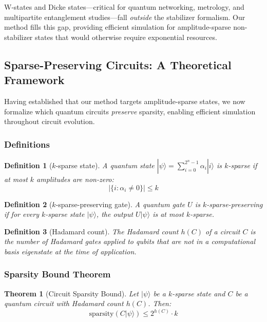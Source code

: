\documentclass[11pt,twocolumn]{article}
\newtheorem{theorem}{Theorem}
\newtheorem{definition}{Definition}
\begin{document}
W-states and Dicke states---critical for quantum networking, metrology, and multipartite entanglement studies---fall \emph{outside} the stabilizer formalism. Our method fills this gap, providing efficient simulation for amplitude-sparse non-stabilizer states that would otherwise require exponential resources.

\subsection{Sparse-Preserving Circuits: A Theoretical Framework}

Having established that our method targets amplitude-sparse states, we now formalize which quantum circuits \emph{preserve} sparsity, enabling efficient simulation throughout circuit evolution.

\subsubsection{Definitions}

\begin{definition}[$k$-sparse state]
A quantum state $|\psi\rangle = \sum_{i=0}^{2^n-1} \alpha_i |i\rangle$ is \emph{$k$-sparse} if at most $k$ amplitudes are non-zero:
\begin{equation}
    |\{i : \alpha_i \neq 0\}| \leq k
\end{equation}
\end{definition}

\begin{definition}[$k$-sparse-preserving gate]
A quantum gate $U$ is \emph{$k$-sparse-preserving} if for every $k$-sparse state $|\psi\rangle$, the output $U|\psi\rangle$ is at most $k$-sparse.
\end{definition}

\begin{definition}[Hadamard count]
The \emph{Hadamard count} $h(C)$ of a circuit $C$ is the number of Hadamard gates applied to qubits that are not in a computational basis eigenstate at the time of application.
\end{definition}

\subsubsection{Sparsity Bound Theorem}

\begin{theorem}[Circuit Sparsity Bound]
\label{thm:sparsity}
Let $|\psi\rangle$ be a $k$-sparse state and $C$ be a quantum circuit with Hadamard count $h(C)$. Then:
\begin{equation}
    \text{sparsity}(C|\psi\rangle) \leq 2^{h(C)} \cdot k
\end{equation}
\end{theorem}
\end{document}
